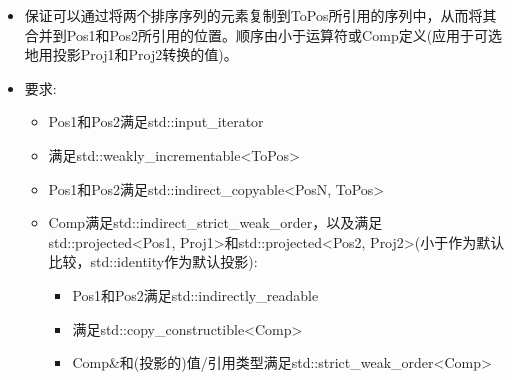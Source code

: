 \begin{itemize}
\item
保证可以通过将两个排序序列的元素复制到ToPos所引用的序列中，从而将其合并到Pos1和Pos2所引用的位置。顺序由小于运算符或Comp定义(应用于可选地用投影Proj1和Proj2转换的值)。

\item
要求:
\begin{itemize}
\item
Pos1和Pos2满足std::input\_iterator

\item
满足std::weakly\_incrementable<ToPos>

\item
Pos1和Pos2满足std::indirect\_copyable<PosN, ToPos>

\item
Comp满足std::indirect\_strict\_weak\_order，以及满足std::projected<Pos1, Proj1>和std::projected<Pos2, Proj2>(小于作为默认比较，std::identity作为默认投影):

\begin{itemize}
\item
Pos1和Pos2满足std::indirectly\_readable

\item
满足std::copy\_constructible<Comp>

\item
Comp\&和(投影的)值/引用类型满足std::strict\_weak\_order<Comp>
\end{itemize}
\end{itemize}
\end{itemize}


